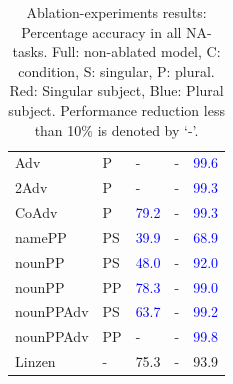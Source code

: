 \begin{center}
\begin{table}[t]
\begin{tabular}{|P{2.3cm}|P{0.4cm}||P{0.6cm}|P{0.6cm}|P{0.6cm}|}
Adv & P &  - &  - &  \textcolor{blue}{99.6} \\

2Adv & P & - &  - &   \textcolor{blue}{99.3} \\

CoAdv & P &  \textcolor{blue}{79.2} &  - &   \textcolor{blue}{99.3} \\

namePP & PS & \textcolor{blue}{39.9} &  - &   \textcolor{blue}{68.9} \\

nounPP & PS &  \textcolor{blue}{48.0} & - &   \textcolor{blue}{92.0} \\

nounPP & PP &  \textcolor{blue}{78.3} & - &   \textcolor{blue}{99.0} \\

nounPPAdv & PS & \textcolor{blue}{63.7} &  - &   \textcolor{blue}{99.2} \\

nounPPAdv & PP & - &  - &   \textcolor{blue}{99.8} \\

\hline

\B Linzen & \B - &   75.3 &  - &  93.9 \\
\hline

\end{tabular}
\caption{Ablation-experiments results: Percentage accuracy in all NA-tasks. Full: non-ablated model, C: condition, S: singular, P: plural. Red: Singular subject, Blue: Plural subject. Performance reduction less than 10\% is denoted by `-'.  \label{tab:ablation-results}}
\end{table}
\end{center}

